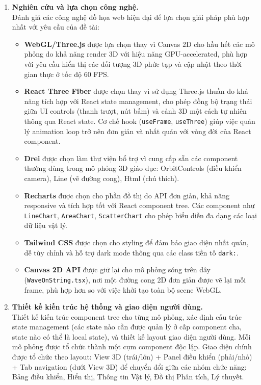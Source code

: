 \begin{enumerate}
    \item \textbf{Nghiên cứu và lựa chọn công nghệ.} \\
    Đánh giá các công nghệ đồ họa web hiện đại để lựa chọn giải pháp phù hợp nhất với yêu cầu của đề tài:
    \begin{itemize}
        \item \textbf{WebGL/Three.js} được lựa chọn thay vì Canvas 2D cho hầu hết các mô phỏng do khả năng render 3D với hiệu năng GPU-accelerated, phù hợp với yêu cầu hiển thị các đối tượng 3D phức tạp và cập nhật theo thời gian thực ở tốc độ 60 FPS.
        \item \textbf{React Three Fiber} được chọn thay vì sử dụng Three.js thuần do khả năng tích hợp với React state management, cho phép đồng bộ trạng thái giữa UI controls (thanh trượt, nút bấm) và cảnh 3D một cách tự nhiên thông qua React state. Cơ chế hook (\texttt{useFrame}, \texttt{useThree}) giúp việc quản lý animation loop trở nên đơn giản và nhất quán với vòng đời của React component.
        \item \textbf{Drei} được chọn làm thư viện bổ trợ vì cung cấp sẵn các component thường dùng trong mô phỏng 3D giáo dục: OrbitControls (điều khiển camera), Line (vẽ đường cong), Html (chú thích).
        \item \textbf{Recharts} được chọn cho phần đồ thị do API đơn giản, khả năng responsive và tích hợp tốt với React component tree. Các component như \texttt{LineChart}, \texttt{AreaChart}, \texttt{ScatterChart} cho phép biểu diễn đa dạng các loại dữ liệu vật lý.
        \item \textbf{Tailwind CSS} được chọn cho styling để đảm bảo giao diện nhất quán, dễ tùy chỉnh và hỗ trợ dark mode thông qua các class tiền tố \texttt{dark:}.
        \item \textbf{Canvas 2D API} được giữ lại cho mô phỏng sóng trên dây (\texttt{WaveOnString.tsx}), nơi một đường cong 2D đơn giản được vẽ lại mỗi frame, phù hợp hơn so với việc khởi tạo toàn bộ scene WebGL.
    \end{itemize}

    \item \textbf{Thiết kế kiến trúc hệ thống và giao diện người dùng.} \\
    Thiết kế kiến trúc component tree cho từng mô phỏng, xác định cấu trúc state management (các state nào cần được quản lý ở cấp component cha, state nào có thể là local state), và thiết kế layout giao diện người dùng. Mỗi mô phỏng được tổ chức thành một cụm component độc lập. Giao diện chính được tổ chức theo layout: View 3D (trái/lớn) + Panel điều khiển (phải/nhỏ) + Tab navigation (dưới View 3D) để chuyển đổi giữa các nhóm chức năng: Bảng điều khiển, Hiển thị, Thông tin Vật lý, Đồ thị Phân tích, Lý thuyết.


\end{enumerate}
